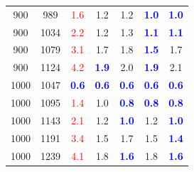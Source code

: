 \begin{tabular}{|cc|c|cccc|}
900 & 989 & \textcolor{red}{1.6} & 1.2 & 1.2 & \textbf{\textcolor{blue}{1.0}} & \textbf{\textcolor{blue}{1.0}}\\
900 & 1034 & \textcolor{red}{2.2} & 1.2 & 1.3 & \textbf{\textcolor{blue}{1.1}} & \textbf{\textcolor{blue}{1.1}}\\
900 & 1079 & \textcolor{red}{3.1} & 1.7 & 1.8 & \textbf{\textcolor{blue}{1.5}} & 1.7\\
900 & 1124 & \textcolor{red}{4.2} & \textbf{\textcolor{blue}{1.9}} & 2.0 & \textbf{\textcolor{blue}{1.9}} & 2.1\\
1000 & 1047 & \textbf{\textcolor{blue}{0.6}} & \textbf{\textcolor{blue}{0.6}} & \textbf{\textcolor{blue}{0.6}} & \textbf{\textcolor{blue}{0.6}} & \textbf{\textcolor{blue}{0.6}}\\
1000 & 1095 & \textcolor{red}{1.4} & 1.0 & \textbf{\textcolor{blue}{0.8}} & \textbf{\textcolor{blue}{0.8}} & \textbf{\textcolor{blue}{0.8}}\\
1000 & 1143 & \textcolor{red}{2.1} & 1.2 & \textbf{\textcolor{blue}{1.0}} & 1.2 & \textbf{\textcolor{blue}{1.0}}\\
1000 & 1191 & \textcolor{red}{3.4} & 1.5 & 1.7 & 1.5 & \textbf{\textcolor{blue}{1.4}}\\
1000 & 1239 & \textcolor{red}{4.1} & 1.8 & \textbf{\textcolor{blue}{1.6}} & 1.8 & \textbf{\textcolor{blue}{1.6}}\\
\hline
\end{tabular}
